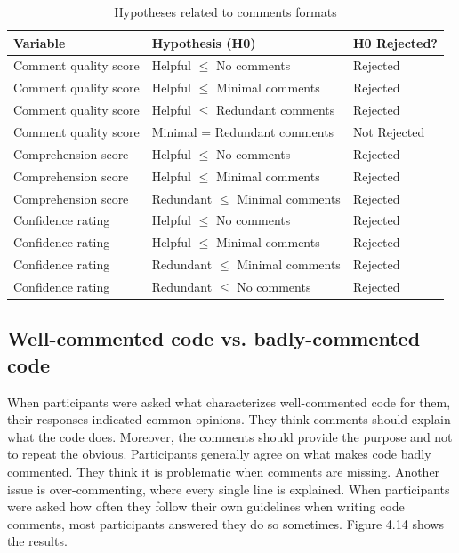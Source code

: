 \begin{table}[ht]
\centering
\small
\begin{tabular}{|p{4cm}|p{6cm}|p{2.5cm}|}
\hline
\rule{0pt}{1.2em}\textbf{Variable} & \textbf{Hypothesis (H0)} & \textbf{H0 Rejected?} \\[0.5em]
\hline
\rule{0pt}{1.2em}Comment quality score & Helpful $\leq$ No comments & Rejected \\[0.5em]
\hline
\rule{0pt}{1.2em}Comment quality score & Helpful $\leq$ Minimal comments & Rejected \\[0.5em]
\hline
\rule{0pt}{1.2em}Comment quality score & Helpful $\leq$ Redundant comments & Rejected \\[0.5em]
\hline
\rule{0pt}{1.2em}Comment quality score & Minimal = Redundant comments & Not Rejected \\[0.5em]
\hline
\rule{0pt}{1.2em}Comprehension score & Helpful $\leq$ No comments & Rejected \\[0.5em]
\hline
\rule{0pt}{1.2em}Comprehension score & Helpful $\leq$ Minimal comments & Rejected \\[0.5em]
\hline
\rule{0pt}{1.2em}Comprehension score & Redundant $\leq$ Minimal comments & Rejected \\[0.5em]
\hline
\rule{0pt}{1.2em}Confidence rating & Helpful $\leq$ No comments & Rejected \\[0.5em]
\hline
\rule{0pt}{1.2em}Confidence rating & Helpful $\leq$ Minimal comments & Rejected \\[0.5em]
\hline
\rule{0pt}{1.2em}Confidence rating & Redundant $\leq$ Minimal comments & Rejected \\[0.5em]
\hline
\rule{0pt}{1.2em}Confidence rating & Redundant $\leq$ No comments & Rejected \\[0.5em]
\hline
\end{tabular}
\caption{Hypotheses related to comments formats}
\end{table}



\subsection{Well-commented code vs. badly-commented code }

When participants were asked what characterizes well-commented code for them, their responses indicated common opinions. They think comments should explain what the code does. Moreover, the comments should provide the purpose and not to repeat the obvious. Participants generally agree on what makes code badly commented. They think it is problematic when comments are missing. Another issue is over-commenting, where every single line is explained.
When participants were asked how often they follow their own guidelines when writing code comments, most participants answered they do so sometimes. Figure 4.14 shows the results.

